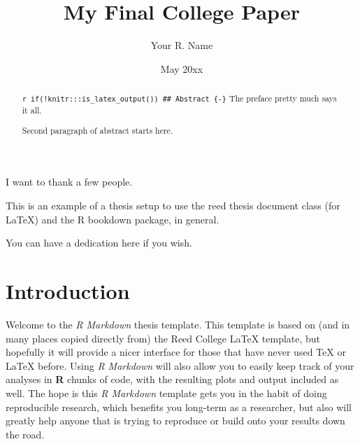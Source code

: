 \documentclass[12pt,twoside]{reedthesis}
\title{My Final College Paper}
\author{Your R. Name}
\date{May 20xx}
\begin{document}
      \maketitle
  
  \frontmatter %
  \pagestyle{empty} %

      \begin{acknowledgements}
      I want to thank a few people.
    \end{acknowledgements}
  
      \begin{preface}
      This is an example of a thesis setup to use the reed thesis document
      class (for LaTeX) and the R bookdown package, in general.
    \end{preface}
  
      \hypersetup{linkcolor=black}
    \setcounter{tocdepth}{2}
    \tableofcontents
  
      \listoftables
  
      \listoffigures
  
      \begin{abstract}
      \texttt{r\ if(!knitr:::is\_latex\_output())\ \textquotesingle{}\#\#\ Abstract\ \{-\}\textquotesingle{}}
      The preface pretty much says it all. \par  Second paragraph of abstract
      starts here.
    \end{abstract}
  
      \begin{dedication}
      You can have a dedication here if you wish.
    \end{dedication}
  
  \mainmatter %
  \pagestyle{fancyplain} %

  \chapter*{Introduction}\label{introduction}
  
  Welcome to the \emph{R Markdown} thesis template. This template is based
  on (and in many places copied directly from) the Reed College LaTeX
  template, but hopefully it will provide a nicer interface for those that
  have never used TeX or LaTeX before. Using \emph{R Markdown} will also
  allow you to easily keep track of your analyses in \textbf{R} chunks of
  code, with the resulting plots and output included as well. The hope is
  this \emph{R Markdown} template gets you in the habit of doing
  reproducible research, which benefits you long-term as a researcher, but
  also will greatly help anyone that is trying to reproduce or build onto
  your results down the road.
  
\end{document}
